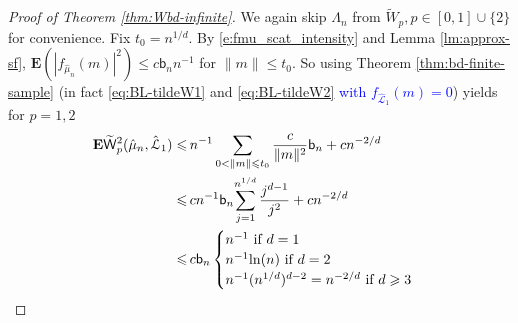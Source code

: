 \documentclass[12pt]{article}
\newcommand{\Leb}{\mathcal{L}}
\newcommand{\bn}{   \mathsf b_{n}}
\newcommand{\1}{\mathbf{1}}
\newcommand{\dy}[1]{\textcolor{blue}{#1}}
\newcommand{\dy}[1]{#1}%
\begin{document}
{{{{{\begin{proof}[Proof of Theorem \ref{thm:Wbd-infinite}]
We again skip $\Lambda_n$ from $\tilde{W}_p, p \in [0,1] \cup \{2\}$ for convenience.  {Fix $t_0 = n^{1/d}$.} By \eqref{e:fmu_scat_intensity} and Lemma  \ref{lm:approx-sf},  $ \mathbf{E}  ( | f_{ \hat \mu _{n}}(m) | ^{2})\leqslant c \bn n^{-1}$  {for $\|m\| \leq t_0$}. So using Theorem  \ref{thm:bd-finite-sample} (in fact \eqref{eq:BL-tildeW1} and \eqref{eq:BL-tildeW2} \dy{with $f_{\hat{\Leb}_1}(m) = 0$}) yields for $ p= 1,2$
\begin{align*}
\mathbf{E}  \widetilde{  \mathsf W}^{2}_{p}(\hat \mu _{n},\hat{\Leb}_{1})
 \leqslant & \,
 {n^{-1}\sum_{0< \| m \| \leqslant t_0}\frac{c}{\| m \|^{2}}}\bn +cn^{-2/d}
 \\
\leqslant & \,
c
n^{-1}  \bn {\sum_{j= 1}^{n^{1/d}}\frac{ j^{d-1}}{j^{2}}}+cn^{-2/d}
\\
\leqslant & \, c\bn \begin{cases}
n^{-1} $  if $d= 1\\
n^{-1}{\ln(n)}$  if $d= 2\\
n^{-1}{(n^{1/d})^{d-2}}= n^{-2/d}$  if $d\geqslant 3
 \end{cases}
\end{align*}


\end{proof}}}}}}
\end{document}
